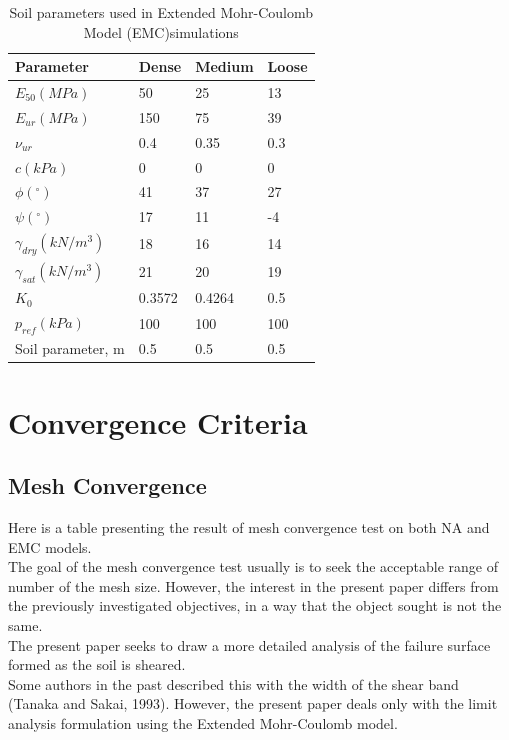 \documentclass[a4paper, nobind]{templates/ociamthesis}
\begin{document}
\begin{table}[H]
\centering
{%
\begin{tabular}{@{}llll@{}}
\toprule
Parameter               & Dense   & Medium  & Loose  \\ \midrule
$E_{50} (MPa)$          & 50      & 25      & 13     \\
$E_{ur} (MPa)$          & 150     & 75      & 39     \\
$\nu_{ur}$              & 0.4     & 0.35    & 0.3    \\
$c (kPa)$               & 0       & 0       & 0      \\
$\phi(^{\circ})$        & 41      & 37      & 27     \\
$\psi(^{\circ})$        & 17      & 11      & -4     \\
$\gamma_{dry}(kN/m^3)$  & 18      & 16      & 14     \\
$\gamma_{sat}(kN/m^3)$  & 21      & 20      & 19     \\
$K_0$                   & 0.3572  & 0.4264  & 0.5    \\
$p_{ref} (kPa)$         & 100     & 100     & 100    \\
Soil parameter, m       & 0.5     & 0.5     & 0.5    \\ \bottomrule
\end{tabular}%
}
\caption{Soil parameters used in Extended Mohr-Coulomb Model (EMC)simulations}
\label{tab:Soil parameters used in Extended Mohr-Coulomb Model simulations}
\end{table}

\hypertarget{convergence-criteria}{%
\section{Convergence Criteria}\label{convergence-criteria}}

\hypertarget{mesh-convergence}{%
\subsection{Mesh Convergence}\label{mesh-convergence}}

Here is a table presenting the result of mesh convergence test on both NA and EMC models.\\
The goal of the mesh convergence test usually is to seek the acceptable range of number of the mesh size.
However, the interest in the present paper differs from the previously investigated objectives, in a way that the object sought is not the same.\\
The present paper seeks to draw a more detailed analysis of the failure surface formed as the soil is sheared.\\
Some authors in the past described this with the width of the shear band (Tanaka and Sakai, 1993). However, the present paper deals only with the limit analysis formulation using the Extended Mohr-Coulomb model.
\end{document}
